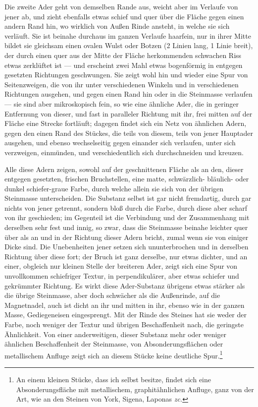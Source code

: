 \documentclass[a4paper, 11pt, oneside, german]{article}
\begin{document}
Die zweite Ader geht von demselben Rande aus, weicht aber im Verlaufe von jener ab, und zieht ebenfalls etwas schief und quer über die Fläche gegen einen andern Rand hin, wo wirklich von Außen Rinde ansteht, in welche sie sich verläuft. Sie ist beinahe durchaus im ganzen Verlaufe haarfein, nur in ihrer Mitte bildet sie gleichsam einen ovalen Wulst oder Botzen (2 Linien lang, 1 Linie breit), der durch einen quer aus der Mitte der Fläche herkommenden schwachen Riss etwas zerklüftet ist --- und erscheint zwei Mahl etwas bogenförmig in entgegen gesetzten Richtungen geschwungen. Sie zeigt wohl hin und wieder eine Spur von Seitenzweigen, die von ihr unter verschiedenen Winkeln und in verschiedenen Richtungen ausgehen, und gegen einen Rand hin oder in die Steinmasse verlaufen --- sie sind aber mikroskopisch fein, so wie eine ähnliche Ader, die in geringer Entfernung von dieser, und fast in paralleler Richtung mit ihr, frei mitten auf der Fläche eine Strecke fortläuft; dagegen findet sich ein Netz von ähnlichen Adern, gegen den einen Rand des Stückes, die teils von diesem, teils von jener Hauptader ausgehen, und ebenso wechselseitig gegen einander sich verlaufen, unter sich verzweigen, einmünden, und verschiedentlich sich durchschneiden und kreuzen.

Alle diese Adern zeigen, sowohl auf der geschnittenen Fläche als an den, dieser entgegen gesetzten, frischen Bruchstellen, eine matte, schwärzlich- bläulich- oder dunkel schiefer-graue Farbe, durch welche allein sie sich von der übrigen Steinmasse unterscheiden. Die Substanz selbst ist gar nicht fremdartig, durch gar nichts von jener getrennt, sondern bloß durch die Farbe, durch diese aber scharf von ihr geschieden; im Gegenteil ist die Verbindung und der Zusammenhang mit derselben sehr fest und innig, so zwar, dass die Steinmasse beinahe leichter quer über als an und in der Richtung dieser Adern bricht, zumal wenn sie von einiger Dicke sind. Die Unebenheiten jener setzen sich ununterbrochen und in derselben Richtung über diese fort; der Bruch ist ganz derselbe, nur etwas dichter, und an einer, obgleich nur kleinen Stelle der breiteren Ader, zeigt sich eine Spur von unvollkommen schiefriger Textur, in perpendikulärer, aber etwas schiefer und gekrümmter Richtung. Es wirkt diese Ader-Substanz übrigens etwas stärker als die übrige Steinmasse, aber doch schwächer als die Außenrinde, auf die Magnetnadel, auch ist dicht an ihr und mitten in ihr, ebenso wie in der ganzen Masse, Gediegeneisen eingesprengt. Mit der Rinde des Steines hat sie weder der Farbe, noch weniger der Textur und übrigen Beschaffenheit nach, die geringste Ähnlichkeit. Von einer anderweitigen, dieser Substanz mehr oder weniger ähnlichen Beschaffenheit der Steinmasse, von Absonderungsflächen oder metallischem Anfluge zeigt sich an diesem Stücke keine deutliche Spur.\footnote{An einem kleinen Stücke, dass ich selbst besitze, findet sich eine Absonderungsfläche mit metallischem, graphitähnlichen Anfluge, ganz von der Art, wie an den Steinen von York, Sigena, Laponas \emph{zc.}}
\end{document}

